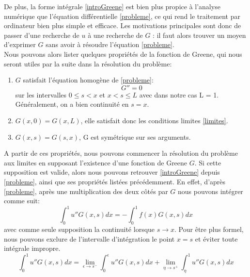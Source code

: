 \documentclass[12pt]{article}
\begin{document}
De plus, la forme intégrale \eqref{introGreene} est bien plus propice à l'analyse numérique que l'équation différentielle \eqref{probleme}, ce qui rend le traitement par ordinateur bien plus simple et efficace. Les motivations principales sont donc de passer d'une recherche de $u$ à une recherche de $G$ : il faut alors trouver un moyen d'exprimer $G$ sans avoir à résoudre l'équation \eqref{probleme}.\\
Nous pouvons alors lister quelques propriétés de la fonction de Greene, qui nous seront utiles par la suite dans la résolution du problème:
\begin{enumerate}
  \item $G$ satisfait l'équation homogène de  \eqref{probleme}:
	\begin{equation}
		G'' = 0
	\end{equation}
	sur les intervalles $0 \le s < x$ et $x < s \le L$ avec dans notre cas L = 1. Généralement, on a bien continuité en $s = x$.
  \item $G(x, 0) = G(x, L)$, elle satisfait donc les conditions limites \eqref{limites}.
  \item $G(x,s) = G(s, x)$, G est symétrique sur ses arguments.
\end{enumerate}

A partir de ces propriétés, nous pouvons commencer la résolution du problème aux limites en supposant l'existence d'une fonction de Greene $G$. Si cette supposition est valide, alors nous pouvons retrouver \eqref{introGreene} depuis \eqref {probleme}, ainsi que ses propriétés listées précédemment.  En effet,  d'après \eqref{probleme}, après une multiplication des deux côtés par $G$ nous pouvons intégrer comme suit:
\begin{equation}
\int_0^1 u'' G(x,s) dx = - \int_0^1 f(x) G(x,s) dx
\end{equation}
avec comme seule supposition la continuité lorsque $s \rightarrow x$. Pour être plus formel, nous pouvons exclure de l'intervalle d'intégration le point $x = s$ et éviter toute intégrale impropre.
\begin{equation} \label{separation}
\int_0^1 u'' G(x,s) dx = \lim_{\epsilon \to s^- } \int_0^\epsilon u'' G(x,s) dx + \lim_{\eta \to s^+ } \int_\eta^1 u'' G(x,s) dx
\end{equation}
\end{document}
